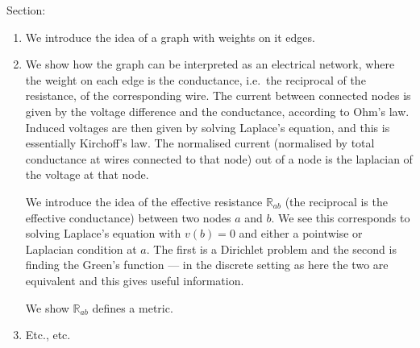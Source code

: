 \documentclass[a4paper]{amsart}
\theoremstyle{plain}
\theoremstyle{definition}
\theoremstyle{remark}
\DeclareMathOperator{\lap}{\Delta}
\begin{document}
\bigskip Section:
\begin{enumerate}


\item[2]
We introduce the idea of a graph with weights on it edges.

\item[3] We show how the graph can be interpreted as an electrical network, where the weight  on each edge is the conductance, i.e.\ the reciprocal of the resistance, of the corresponding wire.  The current between connected nodes is given by the voltage difference and the conductance, according to Ohm's law. 
Induced voltages are then given by solving Laplace's equation, and this is essentially Kirchoff's law. The normalised current (normalised by total conductance at wires connected to that node) out of a node is the laplacian of the voltage at that node.

We introduce the idea of the effective resistance  $ \mathbb{R}_{ab} $ (the reciprocal is  the effective conductance) between two nodes $ a   $ and $  b $.  We see this corresponds to solving Laplace's equation with $ v(b) = 0 $ and either a pointwise or Laplacian condition at $  a$.  The first is a Dirichlet problem and the second is finding the Green's function --- in the discrete setting as here the two are equivalent and this gives useful information.

We show $ \mathbb{R}_{ab} $ defines a metric.

\item[4] Etc., etc.




%


\end{enumerate} 
\end{document}
